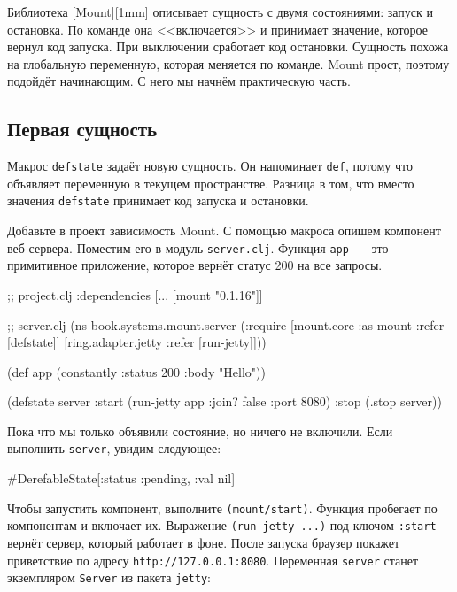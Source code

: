
Библиотека [Mount][1mm] описывает сущность с
двумя состояниями: запуск и остановка. По команде она <<включается>> и принимает
значение, которое вернул код запуска. При выключении сработает код
остановки. Сущность похожа на глобальную переменную, которая меняется по
команде. Mount прост, поэтому подойдёт начинающим. С него мы начнём
практическую часть.

\subsection{Первая сущность}


Макрос \verb|defstate| задаёт новую сущность. Он напоминает \verb|def|,
потому что объявляет переменную в текущем пространстве. Разница в том, что
вместо значения \verb|defstate| принимает код запуска и остановки.

Добавьте в проект зависимость Mount. С помощью макроса опишем компонент
веб-сервера. Поместим его в модуль \verb|server.clj|. Функция \verb|app|~--- это
примитивное приложение, которое вернёт статус 200 на все запросы.

\begin{english}
  \begin{clojure}
;; project.clj
:dependencies [... [mount "0.1.16"]]

;; server.clj
(ns book.systems.mount.server
  (:require
   [mount.core :as mount :refer [defstate]]
   [ring.adapter.jetty :refer [run-jetty]]))

(def app (constantly {:status 200 :body "Hello"}))

(defstate server
  :start (run-jetty app {:join? false :port 8080})
  :stop (.stop server))
  \end{clojure}
\end{english}

Пока что мы только объявили состояние, но ничего не включили. Если выполнить
\verb|server|, увидим следующее:

\begin{english}
  \begin{clojure}
#DerefableState[{:status :pending, :val nil}]
  \end{clojure}
\end{english}

Чтобы запустить компонент, выполните \verb|(mount/start)|. Функция пробегает
по компонентам и включает их. Выражение \verb|(run-jetty ...)| под ключом
\verb|:start| вернёт сервер, который работает в фоне. После запуска браузер
покажет приветствие по адресу \verb|http://127.0.0.1:8080|. Переменная
\verb|server| станет экземпляром \verb|Server| из пакета \verb|jetty|:


